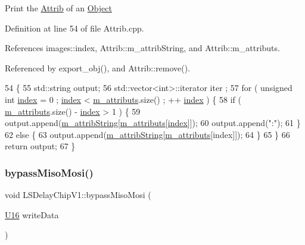 Print the \hyperlink{classAttrib}{Attrib} of an \hyperlink{classObject}{Object} 

Definition at line 54 of file Attrib.\+cpp.



References images\+::index, Attrib\+::m\+\_\+attrib\+String, and Attrib\+::m\+\_\+attributs.



Referenced by export\+\_\+obj(), and Attrib\+::remove().


\begin{DoxyCode}
54                             \{
55   std::string output;
56   std::vector<int>::iterator iter ;
57   \textcolor{keywordflow}{for} ( \textcolor{keywordtype}{unsigned} \textcolor{keywordtype}{int} \hyperlink{namespaceimages_a54407fd574970b3178647ae096321a57}{index} = 0 ; \hyperlink{namespaceimages_a54407fd574970b3178647ae096321a57}{index} < \hyperlink{classAttrib_ac4bd58a0cc6b38a3b711d609a3d3aacc}{m\_attributs}.size() ; ++
      \hyperlink{namespaceimages_a54407fd574970b3178647ae096321a57}{index} ) \{
58     \textcolor{keywordflow}{if} ( \hyperlink{classAttrib_ac4bd58a0cc6b38a3b711d609a3d3aacc}{m\_attributs}.size() - \hyperlink{namespaceimages_a54407fd574970b3178647ae096321a57}{index} > 1 ) \{
59       output.append(\hyperlink{classAttrib_a3414521d7a82476e874b25a5407b5e63}{m\_attribString}[\hyperlink{classAttrib_ac4bd58a0cc6b38a3b711d609a3d3aacc}{m\_attributs}[\hyperlink{namespaceimages_a54407fd574970b3178647ae096321a57}{index}]]);
60       output.append(\textcolor{stringliteral}{":"});
61     \}
62     \textcolor{keywordflow}{else} \{
63       output.append(\hyperlink{classAttrib_a3414521d7a82476e874b25a5407b5e63}{m\_attribString}[\hyperlink{classAttrib_ac4bd58a0cc6b38a3b711d609a3d3aacc}{m\_attributs}[index]]);
64     \}
65   \}
66   \textcolor{keywordflow}{return} output;
67 \}
\end{DoxyCode}
\mbox{\label{classLSDelayChipV1_a9e04b654e8d6d63efe23fc3b31e15ce6}} 
\subsubsection{\texorpdfstring{bypass\+Miso\+Mosi()}{bypassMisoMosi()}}
{\footnotesize\ttfamily void L\+S\+Delay\+Chip\+V1\+::bypass\+Miso\+Mosi (\begin{DoxyParamCaption}\item[{\hyperlink{ICECALv3_8h_adf928e51a60dba0df29d615401cc55a8}{U16}}]{write\+Data }\end{DoxyParamCaption})}



